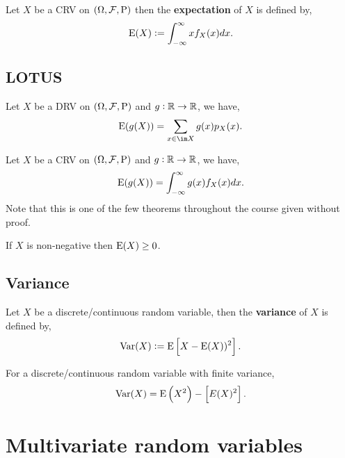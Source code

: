 \documentclass[../Year1/Year1.tex]{subfiles}
\begin{document}
\begingroup\belowdisplayskip=-10pt
\begin{definition}
    Let $X$ be a CRV on $(\Omega,\mathcal{F},\mathrm{P})$ then the \textbf{expectation} of $X$ is defined by, \[
        \mathrm{E}(X) := \int_{-\infty}^{\infty}xf_X(x)dx \textcolor{black}{.}
    \]
\end{definition}
\endgroup
\subsection{LOTUS}

\begingroup\belowdisplayskip=-10pt
\begin{theorem}
    Let $X$ be a DRV on $(\Omega,\mathcal{F},\mathrm{P})$ and $g:\mathbb{R}\rightarrow\mathbb{R}$, we have, \[
        \E(g(X)) = \sum_{x\in\im X}g(x)p_X(x) \textcolor{black}{.}
    \]
\end{theorem}
\endgroup

\begin{theorem}
    Let $X$ be a CRV on $(\Omega,\mathcal{F},\mathrm{P})$ and $g:\mathbb{R}\rightarrow\mathbb{R}$, we have, \[
        \mathrm{E}(g(X)) = \int_{-\infty}^{\infty}g(x)f_X(x)dx \textcolor{black}{.}
    \]
    Note that this is one of the few theorems throughout the course given without proof.
\end{theorem}

\begin{theorem}
    If $X$ is non-negative then $\mathrm{E}(X)\geq0$.
\end{theorem}

\subsection{Variance}
\begingroup\belowdisplayskip=-20pt
\begin{definition}[Variance]
    Let $X$ be a discrete/continuous random variable, then the \textbf{variance} of $X$ is defined by, \[
        \text{Var}(X) := \mathrm{E}\left[X-\mathrm{E}(X))^2\right]\textcolor{black}{.}
    \]
\end{definition}

\begin{theorem}
    For a discrete/continuous random variable with finite variance, \[
    \text{Var}(X) = \mathrm{E}\left(X^2\right)-\left[E(X)^2\right]\textcolor{black}{.}
    \]
\end{theorem}
\endgroup
\section{Multivariate random variables}
\end{document}

